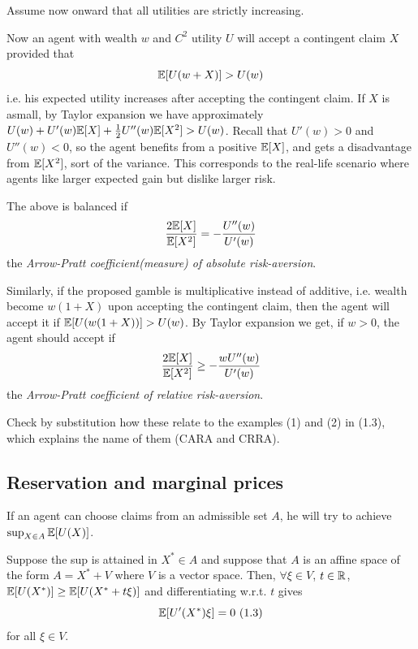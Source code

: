 \documentclass[a4paper]{article}
\begin{document}
Assume now onward that all utilities are strictly increasing.

Now an agent with wealth $w$ and $C^2$ utility $U$ will accept a contingent claim $X$ provided that $$\mathbb{E}[U(w+X)] > U(w)$$ i.e. his expected utility increases after accepting the contingent claim. If $X$ is asmall, by Taylor expansion we have approximately $U(w) + U'(w) \mathbb{E}[X] + \frac{1}{2} U''(w) \mathbb{E}[X^2] > U(w)$. Recall that $U'(w) > 0$ and $U''(w) < 0$, so the agent benefits from a positive $\mathbb{E}[X]$, and gets a disadvantage from $\mathbb{E}[X^2]$, sort of the variance. This corresponds to the real-life scenario where agents like larger expected gain but dislike larger risk.

The above is balanced if $$\frac{2\mathbb{E}[X]}{\mathbb{E}[X^2]} = -\frac{U''(w)}{U'(w)}$$ the \emph{Arrow-Pratt coefficient(measure) of absolute risk-aversion}.

Similarly, if the proposed gamble is multiplicative instead of additive, i.e. wealth become $w(1+X)$ upon accepting the contingent claim, then the agent will accept it if $\mathbb{E}[U(w(1+X))] > U(w)$. By Taylor expansion we get, if $w>0$, the agent should accept if $$\frac{2\mathbb{E}[X]}{\mathbb{E}[X^2]} \geq -\frac{wU''(w)}{U'(w)}$$ the \emph{Arrow-Pratt coefficient of relative risk-aversion}.

Check by substitution how these relate to the examples (1) and (2) in (1.3), which explains the name of them (CARA and CRRA).

\subsection{Reservation and marginal prices}
If an agent can choose claims from an admissible set $A$, he will try to achieve $\sup_{X \in A} \mathbb{E}[U(X)]$.

Suppose the sup is attained in $X^* \in A$ and suppose that $A$ is an affine space of the form $A = X^* + V$ where $V$ is a vector space. Then, $\forall \xi \in V$, $t \in \mathbb{R}$, $\mathbb{E}[U(X^*)] \geq \mathbb{E}[U(X^*+t\xi)]$ and differentiating w.r.t. $t$ gives $$ \mathbb{E}[U'(X^*) \xi] =0 \ (1.3)$$ for all $\xi \in V$.

\end{document}
